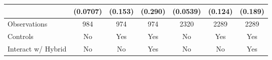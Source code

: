 \begin{tabular}{l*{6}{c}}
          & (0.0707)         &  (0.153)         &  (0.290)         & (0.0539)         &  (0.124)         &  (0.189)         \\
\hline
Observations&      984         &      974         &      974         &     2320         &     2289         &     2289         \\
Controls  &       No         &      Yes         &      Yes         &       No         &      Yes         &      Yes         \\
Interact w/ Hybrid&       No         &       No         &      Yes         &       No         &       No         &      Yes         \\
\end{tabular}
